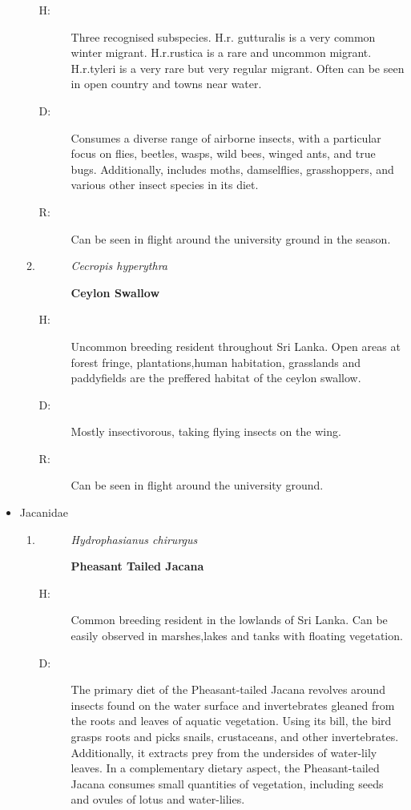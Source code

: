 \begin{itemize}
\begin{enumerate}
\begin{description}%
\item[H: ]%
Three recognised subspecies. H.r. gutturalis is a very common winter migrant. H.r.rustica is a rare and uncommon migrant. H.r.tyleri is a very rare but very regular migrant. Often can be seen in open country and towns near water.%
\item[D: ]%
Consumes a diverse range of airborne insects, with a particular focus on flies, beetles, wasps, wild bees, winged ants, and true bugs. Additionally, includes moths, damselflies, grasshoppers, and various other insect species in its diet.%
\item[R: ]%
Can be seen in flight around the university ground in the season.%
\end{description}%
\item%
\begin{description}%
\item[]%
\textit{Cecropis hyperythra}%
\item[]%
\textbf{Ceylon Swallow}%
\end{description}%
\begin{description}%
\item[H: ]%
Uncommon breeding resident throughout Sri Lanka. Open areas at forest fringe, plantations,human habitation, grasslands and paddyfields are the preffered habitat of the ceylon swallow.%
\item[D: ]%
Mostly insectivorous, taking flying insects on the wing.%
\item[R: ]%
Can be seen in flight around the university ground.%
\end{description}%
\end{enumerate}%
\item%
Jacanidae%
\begin{enumerate}%
\item%
\begin{description}%
\item[]%
\textit{Hydrophasianus chirurgus}%
\item[]%
\textbf{Pheasant Tailed Jacana}%
\end{description}%
\begin{description}%
\item[H: ]%
Common breeding resident in the lowlands of Sri Lanka. Can be easily observed in marshes,lakes and tanks with floating vegetation.%
\item[D: ]%
The primary diet of the Pheasant{-}tailed Jacana revolves around insects found on the water surface and invertebrates gleaned from the roots and leaves of aquatic vegetation. Using its bill, the bird grasps roots and picks snails, crustaceans, and other invertebrates. Additionally, it extracts prey from the undersides of water{-}lily leaves. In a complementary dietary aspect, the Pheasant{-}tailed Jacana consumes small quantities of vegetation, including seeds and ovules of lotus and water{-}lilies.%

\end{description}
\end{enumerate}
\end{itemize}
